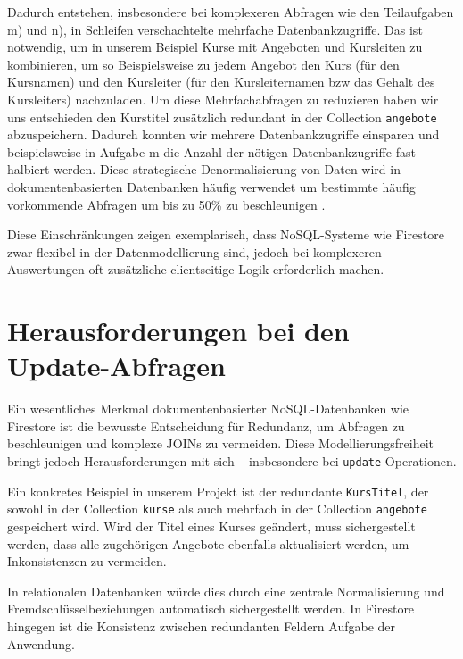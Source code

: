 \documentclass[12pt,a4paper%
              ,oneside     %
              ,titlepage
              ,DIV=13
              ,headinclude
              ,footinclude=false%
              ,cleardoublepage=empty%
              ,parskip=half,
              BCOR=0mm,
              ]{scrreprt}
\begin{document}
Dadurch entstehen, insbesondere bei komplexeren Abfragen wie den Teilaufgaben m) und n), in Schleifen verschachtelte mehrfache Datenbankzugriffe. Das ist notwendig, um in unserem Beispiel Kurse mit Angeboten und Kursleiten zu kombinieren, um so Beispielsweise zu jedem Angebot den Kurs (für den Kursnamen) und den Kursleiter (für den Kursleiternamen bzw das Gehalt des Kursleiters) nachzuladen. Um diese Mehrfachabfragen zu reduzieren haben wir uns entschieden den Kurstitel zusätzlich redundant in der Collection \texttt{angebote} abzuspeichern. Dadurch konnten wir mehrere Datenbankzugriffe einsparen und beispielsweise in Aufgabe m die Anzahl der nötigen Datenbankzugriffe fast halbiert werden. Diese strategische Denormalisierung von Daten wird in dokumentenbasierten Datenbanken häufig verwendet um bestimmte häufig vorkommende Abfragen um bis zu 50\% zu beschleunigen \cite{MoldStud.2025}. 

Diese Einschränkungen zeigen exemplarisch, dass NoSQL-Systeme wie Firestore zwar flexibel in der Datenmodellierung sind, jedoch bei komplexeren Auswertungen oft zusätzliche clientseitige Logik erforderlich machen.

\chapter{Herausforderungen bei den Update-Abfragen}
\label{update-label}

Ein wesentliches Merkmal dokumentenbasierter NoSQL-Datenbanken wie Firestore ist die bewusste Entscheidung für Redundanz, um Abfragen zu beschleunigen und komplexe JOINs zu vermeiden. Diese Modellierungsfreiheit bringt jedoch Herausforderungen mit sich – insbesondere bei \texttt{update}-Operationen.

Ein konkretes Beispiel in unserem Projekt ist der redundante \texttt{KursTitel}, der sowohl in der Collection \texttt{kurse} als auch mehrfach in der Collection \texttt{angebote} gespeichert wird. Wird der Titel eines Kurses geändert, muss sichergestellt werden, dass alle zugehörigen Angebote ebenfalls aktualisiert werden, um Inkonsistenzen zu vermeiden.

In relationalen Datenbanken würde dies durch eine zentrale Normalisierung und Fremdschlüsselbeziehungen automatisch sichergestellt werden. In Firestore hingegen ist die Konsistenz zwischen redundanten Feldern Aufgabe der Anwendung.
\end{document}
